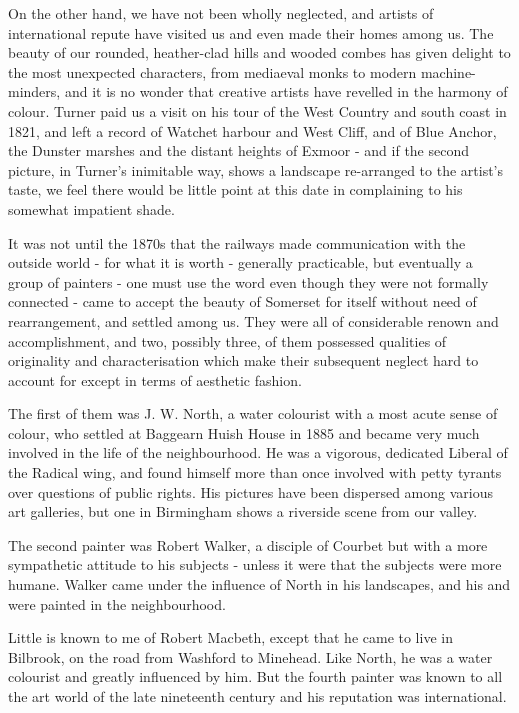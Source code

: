 On the other hand, we have not been wholly neglected, and artists of international repute have visited us and even made their homes among us. The beauty of our rounded, heather-clad hills and wooded combes has given delight to the most unexpected characters, from mediaeval monks to modern machine-minders, and it is no wonder that creative artists have revelled in the harmony of colour. Turner paid us a visit on his tour of the West Country and south coast in 1821, and left a record of Watchet harbour and West Cliff, and of Blue Anchor, the Dunster marshes and the distant heights of Exmoor - and if the second picture, in Turner's inimitable way, shows a landscape re-arranged to the artist's taste, we feel there would be little point at this date in complaining to his somewhat impatient shade.

It was not until the 1870s that the railways made communication with the outside world - for what it is worth - generally practicable, but eventually a group of painters - one must use the word  even though they were not formally connected - came to accept the beauty of Somerset for itself without need of rearrangement, and settled among us. They were all of considerable renown and accomplishment, and two, possibly three, of them possessed qualities of originality and characterisation which make their subsequent neglect hard to account for except in terms of aesthetic fashion.

The first of them was J. W. North, a water colourist with a most acute sense of colour, who settled at Baggearn Huish House in 1885 and became very much involved in the life of the neighbourhood. He was a vigorous, dedicated Liberal of the Radical wing, and found himself more than once involved with petty tyrants over questions of public rights. His pictures have been dispersed among various art galleries, but one in Birmingham shows a riverside scene from our valley.

The second painter was Robert Walker, a disciple of Courbet but with a more sympathetic attitude to his subjects - unless it were that the subjects were more humane. Walker came under the influence of North in his landscapes, and his  and  were painted in the neighbourhood.

Little is known to me of Robert Macbeth, except that he came to live in Bilbrook, on the road from Washford to Minehead. Like North, he was a water colourist and greatly influenced by him. But the fourth painter was known to all the art world of the late nineteenth century and his reputation was international.

